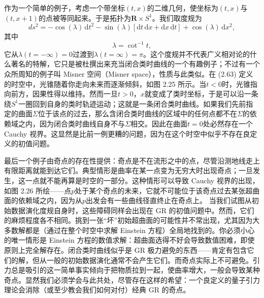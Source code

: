 作为一个简单的例子，考虑一个带坐标$(t,x)$的二维几何，使坐标为$(t,x)$与$(t,x+1)$的点被等同起来。于是拓扑为$\mathbf{R}\times S^1$。我们取度规为
\begin{equation*}
ds^2=-\cos(\lambda)\,\mathrm{d}t^2-\sin(\lambda)\left[\mathrm{d}t\,\mathrm{d}x+\mathrm{d}x\,\mathrm{d}t\right]+\cos(\lambda)\,\mathrm{d}x^2,
\tag{2.63}
\end{equation*}
其中
\begin{equation*}
\lambda=\cot^{-1}t,
\tag{2.64}
\end{equation*}
它从$\lambda(t=-\infty)=0$过渡到$\lambda(t=\infty)=\pi$。这个度规并不代表广义相对论的什么著名的特解，它只是被杜撰出来充当闭合类时曲线的一个有趣例子；不过有一个众所周知的例子叫 Misner 空间（Misner space），性质与此类似。在 (2.63) 定义的时空中，光锥随着你走向未来而逐渐倾斜，如图 2.25 所示。当$t<0$时，光锥指向前方，因果性得以维持。然而一旦$t>0$，$x$就变成了类时坐标，于是可以沿一条绕$S^1$一圈回到自身的类时轨迹运动；这就是一条闭合类时曲线。如果我们先前指定的曲面$\Sigma$位于该点的过去，那么含闭合类时曲线的区域中的任何点都不在$\Sigma$的依赖域之内，因为闭合类时曲线自身不与$\Sigma$相交。因此在曲面$t=0$处必然存在一个 Cauchy 视界。这显然是比前一例更糟的问题，因为在这个时空中似乎不存在良定义的初值问题。

最后一个例子由奇点的存在性提供：奇点是不在流形之中的点，尽管沿测地线走上有限距离就能到达它们。典型情形是曲率在某一点变为无穷大时出现奇点；一旦发生，这一点就不能再算是时空的一部分。这种情形可以导致 Cauchy 视界的出现，如图 2.26 所绘——点$p$处于某个奇点的未来，它就不可能位于该奇点过去某张超曲面的依赖域之内，因为从$p$出发会有一些曲线径直终止在奇点上。
当我们试图从初始数据演化度规自身时，这些障碍同样会出现在 GR 的初值问题中。然而，它们的麻烦程度各不相同。挑到一张“坏”初始超曲面的可能性并不常出现，尤其因为大多数解都是（通过在整个时空中求解 Einstein 方程）全局地找到的。你必须小心的唯一情形是 Einstein 方程的数值求解：超曲面选得不好会导致数值困难，即使原则上完全解存在。闭合类时曲线似乎是 GR 极力避免的东西——肯定有包含它们的解，但从一般的初始数据演化通常不会产生它们。而奇点实际上不可避免。引力总是吸引的这一简单事实倾向于把物质拉到一起，使曲率增大，一般会导致某种奇点。显然我们必须学会与此共处，尽管存在这样的希望：一个良定义的量子引力理论会消除（或至少教会我们如何对付）经典 GR 的奇点。

